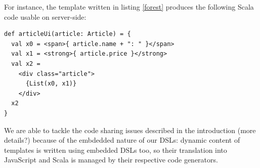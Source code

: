 \documentclass[preprint]{sigplanconf}
\newcommand{\eg}{\emph{e.g.}}
\begin{document}
For instance, the template written in listing \ref{forest} produces the following Scala code usable on
server-side:

\begin{lstlisting}
def articleUi(article: Article) = {
  val x0 = <span>{ article.name + ": " }</span>
  val x1 = <strong>{ article.price }</strong>
  val x2 =
    <div class="article">
      {List(x0, x1)}
    </div>
  x2
}
\end{lstlisting}

We are able to tackle the code sharing issues described in the introduction (more details?) because of the embdedded
nature of our DSLs: dynamic content of templates is written using embedded DSLs too, so their translation into
JavaScript and Scala is managed by their respective code generators.

% 
% 
% 
\end{document}
